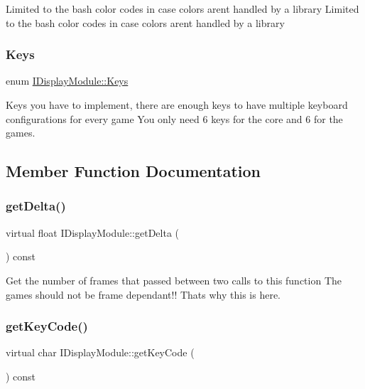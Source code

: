 Limited to the bash color codes in case colors aren\textquotesingle{}t handled by a library Limited to the bash color codes in case colors aren\textquotesingle{}t handled by a library \mbox{\label{class_i_display_module_ac77668b52466bcd2dbd8446e5bfe412f}} 
\subsubsection{\texorpdfstring{Keys}{Keys}}
{\footnotesize\ttfamily enum \hyperlink{class_i_display_module_ac77668b52466bcd2dbd8446e5bfe412f}{I\+Display\+Module\+::\+Keys}}

Keys you have to implement, there are enough keys to have multiple keyboard configurations for every game You only need 6 keys for the core and 6 for the games. 

\subsection{Member Function Documentation}
\mbox{\label{class_i_display_module_a21d9f0b15b586f53073c76e0d586bc88}} 
\subsubsection{\texorpdfstring{get\+Delta()}{getDelta()}}
{\footnotesize\ttfamily virtual float I\+Display\+Module\+::get\+Delta (\begin{DoxyParamCaption}{ }\end{DoxyParamCaption}) const\hspace{0.3cm}{\ttfamily [pure virtual]}}

Get the number of frames that passed between two calls to this function The games should not be frame dependant!! That\textquotesingle{}s why this is here. \mbox{\label{class_i_display_module_aefd588066cd4ede668497dbc4ad23b9d}} 
\subsubsection{\texorpdfstring{get\+Key\+Code()}{getKeyCode()}}
{\footnotesize\ttfamily virtual char I\+Display\+Module\+::get\+Key\+Code (\begin{DoxyParamCaption}{ }\end{DoxyParamCaption}) const\hspace{0.3cm}{\ttfamily [pure virtual]}}

